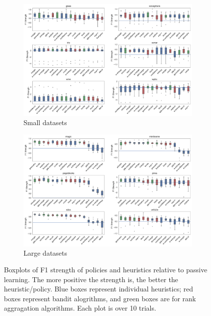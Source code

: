 \documentclass[fleqn,10pt,lineno]{wlpeerj} %
\begin{document}
\begin{figure}[tbp]
	\centering
	\begin{subfigure}[t]{\textwidth}
        \centering
        \includegraphics[width=\textwidth]{figures/strengths-f1-small}
        \caption{Small datasets}
	\end{subfigure}
	\begin{subfigure}[t]{\textwidth}
        \centering
        \includegraphics[width=\textwidth]{figures/strengths-f1-large}
        \caption{Large datasets}
    \end{subfigure}
	\caption[Policy strength]{Boxplots of F1 strength of policies and
	heuristics relative to passive learning. The more positive the strength is,
	the better the heuristic/policy. Blue boxes represent individual
	heuristics; red boxes represent bandit alogrithms, and green boxes are for
	rank aggragation algorithms. Each plot is over 10 trials.}
	\label{fig:strengths-f1}
\end{figure}
\end{document}
